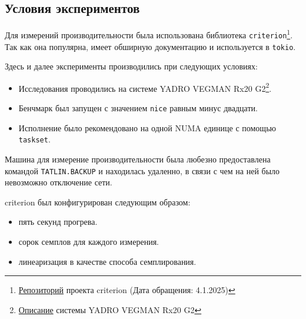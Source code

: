\subsection{Условия экспериментов}

Для измерений производительности была использована библиотека \verb|criterion|\footnote{\href{https://github.com/bheisler/criterion.rs}{Репозиторий} проекта criterion (Дата обращения: 4.1.2025)}. Так как она популярна, имеет обширную документацию и используется в \verb|tokio|.

Здесь и далее эксперименты производились при следующих условиях:

\begin{itemize}
    \item Исследования проводились на системе YADRO VEGMAN Rx20 G2\footnote{\href{https://yadro.com/ru/vegman/rx20g2/specs}{Описание} системы YADRO VEGMAN Rx20 G2}.
    \item Бенчмарк был запущен с значением \verb|nice| равным минус двадцати.
    \item Исполнение было рекомендовано на одной NUMA единице с помощью \verb|taskset|.
\end{itemize}

Машина для измерение производительности была любезно предоставлена командой \verb|TATLIN.BACKUP| и находилась удаленно, в связи с чем на ней было невозможно отключение сети.

criterion был конфигурирован следующим образом:

\begin{itemize}
    \item пять секунд прогрева.
    \item сорок семплов для каждого измерения.
    \item линеаризация в качестве способа семплирования.
\end{itemize}
